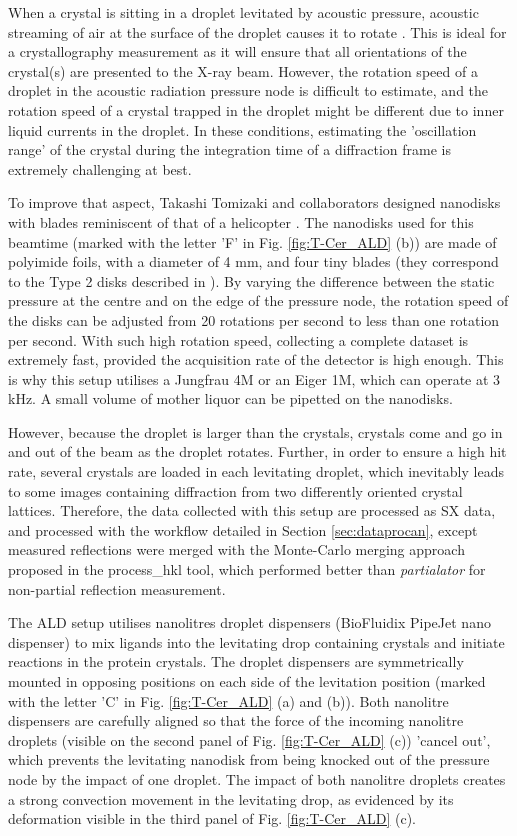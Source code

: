 When a crystal is sitting in a droplet levitated by acoustic pressure, acoustic streaming of air at the surface of the droplet causes it to rotate \parencite{zhaoInternalCirculationDrop1999}. This is ideal for a crystallography measurement as it will ensure that all orientations of the crystal(s) are presented to the X-ray beam. However, the rotation speed of a droplet in the acoustic radiation pressure node is difficult to estimate, and the rotation speed of a crystal trapped in the droplet might be different due to inner liquid currents in the droplet. In these conditions, estimating the 'oscillation range' of the crystal during the integration time of a diffraction frame is extremely challenging at best. 

To improve that aspect, Takashi Tomizaki and collaborators designed nanodisks with blades reminiscent of that of a helicopter \parencite{kepaAcousticLevitationRotation2022}. The nanodisks used for this beamtime (marked with the letter 'F' in Fig. \ref{fig:T-Cer_ALD} (b)) are made of polyimide foils, with a diameter of 4 mm, and four tiny blades (they correspond to the Type 2 disks described in \cite{kepaAcousticLevitationRotation2022}). By varying the difference between the static pressure at the centre and on the edge of the pressure node, the rotation speed of the disks can be adjusted from 20 rotations per second to less than one rotation per second. With such high rotation speed, collecting a complete dataset is extremely fast, provided the acquisition rate of the detector is high enough. This is why this setup utilises a Jungfrau 4M or an Eiger 1M, which can operate at 3 kHz. A small volume of mother liquor can be pipetted on the nanodisks.

However, because the droplet is larger than the crystals, crystals come and go in and out of the beam as the droplet rotates. Further, in order to ensure a high hit rate, several crystals are loaded in each levitating droplet, which inevitably leads to some images containing diffraction from two differently oriented crystal lattices. Therefore, the data collected with this setup are processed as SX data, and processed with the workflow detailed in Section \ref{sec:dataprocan}, except measured reflections were merged with the Monte-Carlo merging approach proposed in the process\_hkl tool, which performed better than \textit{partialator} for non-partial reflection measurement.

The ALD setup utilises nanolitres droplet dispensers (BioFluidix PipeJet nano dispenser) to mix ligands into the levitating drop containing crystals and initiate reactions in the protein crystals. The droplet dispensers are symmetrically mounted in opposing positions on each side of the levitation position (marked with the letter 'C' in Fig. \ref{fig:T-Cer_ALD} (a) and (b)). Both nanolitre dispensers are carefully aligned so that the force of the incoming nanolitre droplets (visible on the second panel of Fig. \ref{fig:T-Cer_ALD} (c)) 'cancel out', which prevents the levitating nanodisk from being knocked out of the pressure node by the impact of one droplet. The impact of both nanolitre droplets creates a strong convection movement in the levitating drop, as evidenced by its deformation visible in the third panel of Fig. \ref{fig:T-Cer_ALD} (c).

